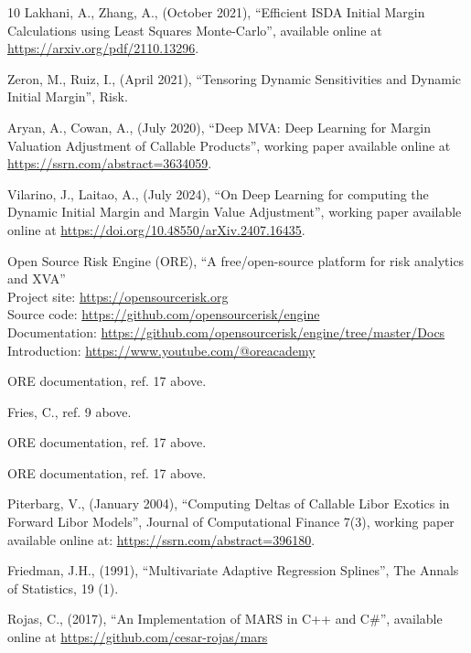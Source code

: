 \documentclass[11pt,a4paper,oneside]{article}
\begin{document}
\begin{thebibliography}{10}
  Lakhani, A., Zhang, A.,
  (October 2021),
  ``Efficient ISDA Initial Margin Calculations using Least Squares Monte-Carlo'',
  available online at \url{https://arxiv.org/pdf/2110.13296}.
  
  Zeron, M., Ruiz, I.,
  (April 2021),
  ``Tensoring Dynamic Sensitivities and Dynamic Initial Margin'',
  Risk.

  Aryan, A., Cowan, A.,
  (July 2020),
  ``Deep MVA: Deep Learning for Margin Valuation Adjustment of Callable Products'',
  working paper available online at \url{https://ssrn.com/abstract=3634059}.

  Vilarino, J., Laitao, A.,
  (July 2024),
  ``On Deep Learning for computing the Dynamic Initial Margin and Margin Value Adjustment'',
  working paper available online at \url{https://doi.org/10.48550/arXiv.2407.16435}.

  Open Source Risk Engine (ORE),
  ``A free/open-source platform for risk analytics and XVA'' \\
  Project site: \url{https://opensourcerisk.org} \\
  Source code: \url{https://github.com/opensourcerisk/engine} \\
  Documentation: \url{https://github.com/opensourcerisk/engine/tree/master/Docs} \\
  Introduction: \url{https://www.youtube.com/@oreacademy}

  ORE documentation, ref. 17 above.

  Fries, C., ref. 9 above.

  ORE documentation, ref. 17 above.

  ORE documentation, ref. 17 above.

  Piterbarg, V.,
  (January 2004),
  ``Computing Deltas of Callable Libor Exotics in Forward Libor Models'',
  Journal of Computational Finance 7(3),
  working paper available online at: \url{https://ssrn.com/abstract=396180}.

  Friedman, J.H.,
  (1991),
  ``Multivariate Adaptive Regression Splines'',
  The Annals of Statistics, 19 (1).

  Rojas, C.,
  (2017),
  ``An Implementation of MARS in C++ and C\#'',
  available online at \url{https://github.com/cesar-rojas/mars}


\end{thebibliography}
\end{document}
